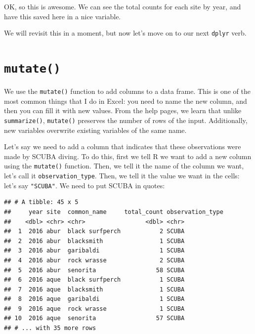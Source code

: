 \documentclass[]{book}
\newenvironment{Shaded}{\begin{snugshade}}{\end{snugshade}}
\newcommand{\DataTypeTok}[1]{\textcolor[rgb]{0.13,0.29,0.53}{#1}}
\newcommand{\KeywordTok}[1]{\textcolor[rgb]{0.13,0.29,0.53}{\textbf{#1}}}
\newcommand{\NormalTok}[1]{#1}
\newcommand{\OperatorTok}[1]{\textcolor[rgb]{0.81,0.36,0.00}{\textbf{#1}}}
\newcommand{\StringTok}[1]{\textcolor[rgb]{0.31,0.60,0.02}{#1}}
\begin{document}
OK, so this is awesome. We can see the total counts for each site by year, and have this saved here in a nice variable.

We will revisit this in a moment, but now let's move on to our next \texttt{dplyr} verb.

\hypertarget{mutate}{%
\section{\texorpdfstring{\texttt{mutate()}}{mutate()}}\label{mutate}}

We use the \texttt{mutate()} function to add columns to a data frame. This is one of the most common things that I do in Excel: you need to name the new column, and then you can fill it with new values. From the help pages, we learn that unlike \texttt{summarize()}, \texttt{mutate()} preserves the number of rows of the input. Additionally, new variables overwrite existing variables of the same name.

Let's say we need to add a column that indicates that these observations were made by SCUBA diving. To do this, first we tell R we want to add a new column using the \texttt{mutate()} function. Then, we tell it the name of the column we want, let's call it \texttt{observation\_type}. Then, we tell it the value we want in the cells: let's say \texttt{"SCUBA"}. We need to put SCUBA in quotes:

\begin{Shaded}
\end{Shaded}

\begin{verbatim}
## # A tibble: 45 x 5
##     year site  common_name     total_count observation_type
##    <dbl> <chr> <chr>                 <dbl> <chr>           
##  1  2016 abur  black surfperch           2 SCUBA           
##  2  2016 abur  blacksmith                1 SCUBA           
##  3  2016 abur  garibaldi                 1 SCUBA           
##  4  2016 abur  rock wrasse               2 SCUBA           
##  5  2016 abur  senorita                 58 SCUBA           
##  6  2016 aque  black surfperch           1 SCUBA           
##  7  2016 aque  blacksmith                1 SCUBA           
##  8  2016 aque  garibaldi                 1 SCUBA           
##  9  2016 aque  rock wrasse               1 SCUBA           
## 10  2016 aque  senorita                 57 SCUBA           
## # ... with 35 more rows
\end{verbatim}
\end{document}
